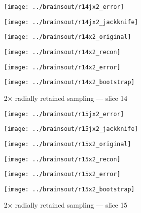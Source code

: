 \documentclass[review,supplement,onefignum,onetabnum,juq]{siamonline181217}
\begin{document}
\begin{figure}
\begin{centering}

\parbox{\imsize}{\texttt{[image: ../brainsout/r14jx2\_error]}}
\parbox{\imsize}{\texttt{[image: ../brainsout/r14jx2\_jackknife]}}

\vspace{\vertsep}

\parbox{\imsize}{\texttt{[image: ../brainsout/r14x2\_original]}}
\parbox{\imsize}{\texttt{[image: ../brainsout/r14x2\_recon]}}

\vspace{\vertsep}

\parbox{\imsize}{\texttt{[image: ../brainsout/r14x2\_error]}}
\parbox{\imsize}{\texttt{[image: ../brainsout/r14x2\_bootstrap]}}

\end{centering}
\caption{2$\times$ radially retained sampling --- slice 14}
\end{figure}


\begin{figure}
\begin{centering}

\parbox{\imsize}{\texttt{[image: ../brainsout/r15jx2\_error]}}
\parbox{\imsize}{\texttt{[image: ../brainsout/r15jx2\_jackknife]}}

\vspace{\vertsep}

\parbox{\imsize}{\texttt{[image: ../brainsout/r15x2\_original]}}
\parbox{\imsize}{\texttt{[image: ../brainsout/r15x2\_recon]}}

\vspace{\vertsep}

\parbox{\imsize}{\texttt{[image: ../brainsout/r15x2\_error]}}
\parbox{\imsize}{\texttt{[image: ../brainsout/r15x2\_bootstrap]}}

\end{centering}
\caption{2$\times$ radially retained sampling --- slice 15}
\end{figure}
\end{document}
